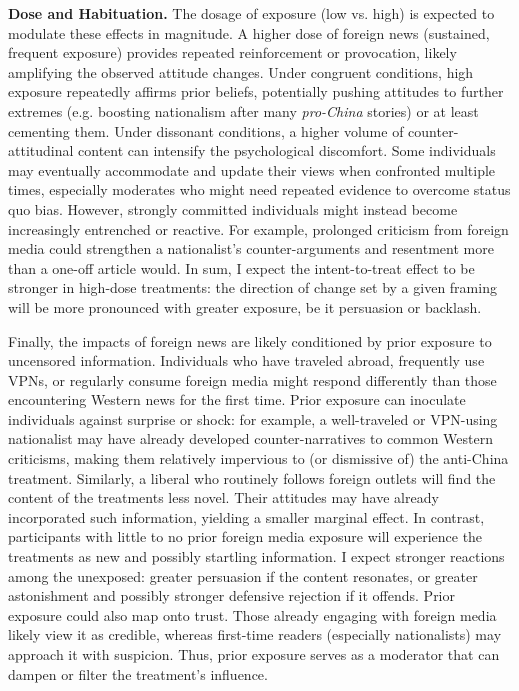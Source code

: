\documentclass[12pt, american]{article}
\begin{document}
\textbf{Dose and Habituation.}  The dosage of exposure (low vs. high) is expected to modulate these effects in magnitude. A higher dose of foreign news (sustained, frequent exposure) provides repeated reinforcement or provocation, likely amplifying the observed attitude changes. Under congruent conditions, high exposure repeatedly affirms prior beliefs, potentially pushing attitudes to further extremes (e.g. boosting nationalism after many \textit{pro-China} stories) or at least cementing them. Under dissonant conditions, a higher volume of counter-attitudinal content can intensify the psychological discomfort. Some individuals may eventually accommodate and update their views when confronted multiple times, especially moderates who might need repeated evidence to overcome status quo bias. However, strongly committed individuals might instead become increasingly entrenched or reactive. For example, prolonged criticism from foreign media could strengthen a nationalist’s counter-arguments and resentment more than a one-off article would. In sum, I expect the intent-to-treat effect to be stronger in high-dose treatments: the direction of change set by a given framing will be more pronounced with greater exposure, be it persuasion or backlash.

Finally, the impacts of foreign news are likely conditioned by prior exposure to uncensored information. Individuals who have traveled abroad, frequently use VPNs, or regularly consume foreign media might respond differently than those encountering Western news for the first time. Prior exposure can inoculate individuals against surprise or shock: for example, a well-traveled or VPN-using nationalist may have already developed counter-narratives to common Western criticisms, making them relatively impervious to (or dismissive of) the anti-China treatment. Similarly, a liberal who routinely follows foreign outlets will find the content of the treatments less novel. Their attitudes may have already incorporated such information, yielding a smaller marginal effect. In contrast, participants with little to no prior foreign media exposure will experience the treatments as new and possibly startling information. I expect stronger reactions among the unexposed: greater persuasion if the content resonates, or greater astonishment and possibly stronger defensive rejection if it offends. Prior exposure could also map onto trust. Those already engaging with foreign media likely view it as credible, whereas first-time readers (especially nationalists) may approach it with suspicion. Thus, prior exposure serves as a moderator that can dampen or filter the treatment’s influence.
\end{document}
